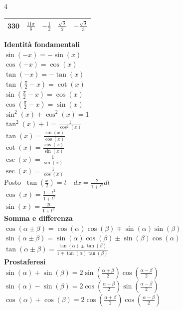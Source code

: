 \documentclass[a4paper, oneside]{article}
\begin{document}
\begin{multicols}{4}
\begin{tabular}{|c|c|c|c|c|}
        \hline
        330 & $\frac{11\pi}{6}$ & $-\frac{1}{2}$ & $\frac{\sqrt{3}}{2}$ & $-\frac{\sqrt{3}}{3}$ \\
        \hline
    \end{tabular}
    \textbf{Identità fondamentali}\\
        $\sin(-x) = -\sin(x)$ \\
        $\cos(-x) = \cos(x)$ \\
        $\tan(-x) = -\tan(x)$ \\
        $\tan\left(\frac{\pi}{2} - x\right) = \cot(x)$ \\
        $\sin\left(\frac{\pi}{2} - x\right) = \cos(x)$ \\
        $\cos\left(\frac{\pi}{2} - x\right) = \sin(x)$\\
        $\sin^2(x) + \cos^2(x) = 1$ \\
        $\tan^2(x) + 1 = \frac{1}{\cos^2(x)}$ \\
        $\tan(x) = \frac{\sin(x)}{\cos(x)}$ \\
        $\cot(x) = \frac{\cos(x)}{\sin(x)}$ \\
        $\csc(x) = \frac{1}{\sin(x)}$ \\
        $\sec(x) = \frac{1}{\cos(x)}$ \\
        Posto $\ \tan\left(\frac{x}{2}\right) = t \quad dx = \frac{2}{1+t^2} dt$ \\
        $\cos(x) = \frac{1 - t^{2}}{1 + t^{2}}$ \\
        $\sin(x) = \frac{2t}{1 + t^{2} }$\\
    \textbf{Somma e differenza}\\
        $\cos(\alpha \pm \beta) = \cos(\alpha)\cos(\beta) \mp \sin(\alpha)\sin(\beta)$ \\
        $\sin(\alpha \pm \beta) = \sin(\alpha)\cos(\beta) \pm \sin(\beta)\cos(\alpha)$ \\
        $\tan(\alpha \pm \beta) = \frac{\tan(\alpha) \pm \tan(\beta)}{1 \mp \tan(\alpha)\tan(\beta)}$ \\
    \textbf{Prostaferesi}\\
        $\sin(\alpha) + \sin(\beta) = 2\sin\left(\frac{\alpha + \beta}{2}\right)\cos\left(\frac{\alpha -\beta}{2}\right)$ \\
        $\sin(\alpha) - \sin(\beta) = 2\cos\left(\frac{\alpha + \beta}{2}\right)\sin\left(\frac{\alpha -\beta}{2}\right)$ \\
        $\cos(\alpha) + \cos(\beta) = 2\cos\left(\frac{\alpha + \beta}{2}\right)\cos\left(\frac{\alpha -\beta}{2}\right)$\\

\end{multicols}
\end{document}

